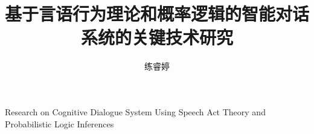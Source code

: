 \author{练睿婷}
\title{基于言语行为理论和概率逻辑的智能对话系统的关键技术研究}
{Research on Cognitive Dialogue System Using Speech Act Theory and Probabilistic Logic Inferences}
\chairman{        }
\grantdate{  }{  }
\appraiser{       }

\team{   }
\fundteam{   }
